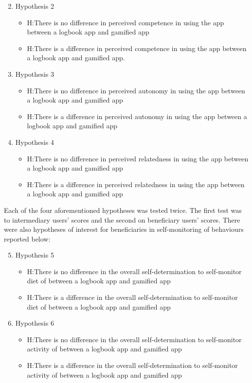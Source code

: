 \begin{enumerate}
 \setcounter{enumi}{1}
\item{Hypothesis 2}
\begin{itemize}
\item{H}:There is no difference in perceived competence in using the app between a logbook app and gamified app
\item{H}:There is a difference in perceived competence in using the app between a logbook app and gamified app.
\end{itemize}
\item{Hypothesis 3}
\begin{itemize}
\item{H}:There is no difference in perceived autonomy in using the app between a logbook app and gamified app
\item{H}:There is a difference in perceived autonomy in using the app between a logbook app and gamified app
\end{itemize}
\item{Hypothesis 4}
\begin{itemize}
\item{H}:There is no difference in perceived relatedness in using the app between a logbook app and gamified app
\item{H}:There is a difference in perceived relatedness in using the app between a logbook app and gamified app
\end{itemize}
\end{enumerate}

Each of the four aforementioned hypotheses was tested twice. The first test was to intermediary users' scores and the second on beneficiary users' scores. There were also hypotheses of interest for beneficiaries in self-monitoring of behaviours reported below:

\begin{enumerate}
 \setcounter{enumi}{4}
\item{Hypothesis 5}
\begin{itemize}
\item{H}:There is no difference in the overall self-determination to self-monitor diet of between a logbook app and gamified app
\item{H}:There is a difference in the overall self-determination to self-monitor diet of between a logbook app and gamified app
\end{itemize}
\item{Hypothesis 6}
\begin{itemize}
\item{H}:There is no difference in the overall self-determination to self-monitor activity of between a logbook app and gamified app
\item{H}:There is a difference in the overall self-determination to self-monitor activity of between a logbook app and gamified app
\end{itemize}
\end{enumerate}

